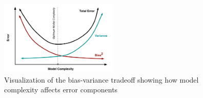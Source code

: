 \documentclass{article}
\begin{document}
  \begin{figure}[H]
    \centering
    \includegraphics[width=0.5\textwidth]{img/biasvariance.png}
    \caption{Visualization of the bias-variance tradeoff showing how model complexity affects error components}
  \end{figure}



\end{document}

